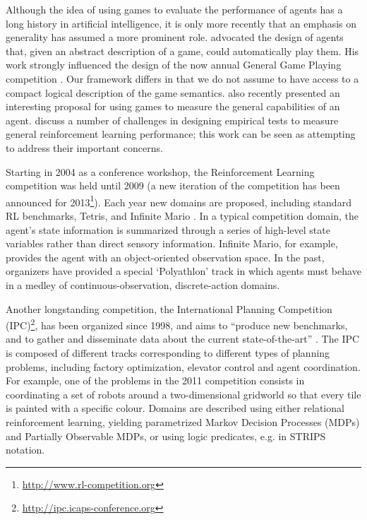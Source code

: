 \documentclass[twoside,11pt]{article}
\begin{document}
Although the idea of using games to evaluate the performance of agents has a long history in artificial intelligence, it is only more recently that an emphasis on generality has assumed a more prominent role.
 advocated the design of agents that, given an abstract description of a game, could automatically play them.
His work strongly influenced the design of the now annual General Game Playing competition \cite{ggpcomp}.
Our framework differs in that we do not assume to have access to a compact logical description of the game semantics.
 also recently presented an interesting proposal for using games to measure the general capabilities of an agent.
 discuss a number of challenges in designing empirical tests to measure general reinforcement learning performance; this work can be seen as attempting to address their important concerns.


Starting in 2004 as a conference workshop, the Reinforcement Learning competition \cite{whiteson10} was held until 2009 (a new iteration of the competition has been announced for 2013\footnote{\url{http://www.rl-competition.org}}). Each year new domains are proposed, including standard RL benchmarks, Tetris, and Infinite Mario \cite{mohan_laird_09}. In a typical competition domain, the agent's state information is summarized through a series of high-level state variables rather than direct sensory information. Infinite Mario, for example, provides the agent with an object-oriented observation space. In the past, organizers have provided a special `Polyathlon' track in which agents must behave in a medley of continuous-observation, discrete-action domains.

Another longstanding competition, the International Planning Competition (IPC)\footnote{\url{http://ipc.icaps-conference.org}}, has been organized since 1998, and aims to ``produce new benchmarks, and to gather and disseminate data about the current state-of-the-art'' \cite{coles_12}. The IPC is composed of different tracks corresponding to different types of planning problems, including factory optimization, elevator control and agent coordination. For example, one of the problems in the 2011 competition consists in coordinating a set of robots around a two-dimensional gridworld so that every tile is painted with a specific colour. Domains are described using either relational reinforcement learning, yielding parametrized Markov Decision Processes (MDPs) and Partially Observable MDPs, or using logic predicates, e.g. in STRIPS notation. 
\end{document}
